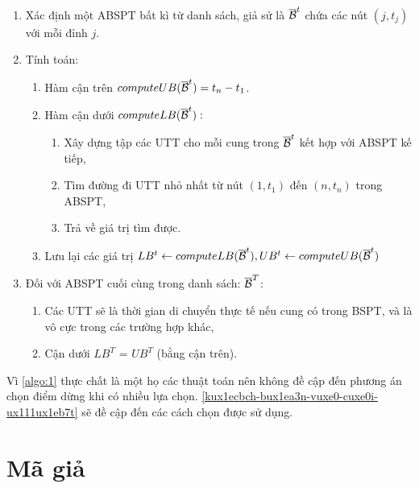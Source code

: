\documentclass[../main.tex]{subfiles}
\begin{document}
\begin{enumerate}
\def\labelenumi{\arabic{enumi}.}
\tightlist
\item
  Xác định một ABSPT bất kì từ danh sách, giả sử là
  \(\overline {\cal B} ^{t}\) chứa các nút \((j, t_j)\) với mỗi đỉnh
  \(j\).
\item
  Tính toán:

  \begin{enumerate}
  \def\labelenumii{\arabic{enumii}.}
  \tightlist
  \item
    Hàm cận trên \(computeUB(\overline {\cal B} ^{t}) = t_n -t_1\).
  \item
    Hàm cận dưới \(computeLB(\overline {\cal B} ^{t}):\)

    \begin{enumerate}
    \def\labelenumiii{\arabic{enumiii}.}
    \tightlist
    \item
      Xây dựng tập các UTT cho mỗi cung trong
      \(\overline {\cal B} ^{t}\) kết hợp với ABSPT kế tiếp,
    \item
      Tìm đường đi UTT nhỏ nhất từ nút \((1, t_1)\) đến \((n, t_n)\)
      trong ABSPT,
    \item
      Trả về giá trị tìm được.
    \end{enumerate}
  \item
    Lưu lại các giá trị
    \(LB^t \gets computeLB(\overline {\cal B} ^{t}), UB^t \gets computeUB(\overline {\cal B} ^{t})\)
  \end{enumerate}
\item
  Đối với ABSPT cuối cùng trong danh sách: \(\overline {\cal B} ^{T}\):

  \begin{enumerate}
  \def\labelenumii{\arabic{enumii}.}
  \tightlist
  \item
    Các UTT sẽ là thời gian di chuyển thực tế nếu cung có trong BSPT, và
    là vô cực trong các trường hợp khác,
  \item
    Cận dưới \(LB^T\) = \(UB^T\) (bằng cận trên).
  \end{enumerate}
\end{enumerate}

Vì \autoref{algo:1} thực chất là một họ các thuật toán nên không đề cập đến
phương án chọn điểm dừng khi có nhiều lựa chọn. \autoref{kux1ecbch-bux1ea3n-vuxe0-cuxe0i-ux111ux1eb7t} sẽ đề cập đến
các cách chọn được sử dụng.

\section{Mã giả}\label{muxe3-giux1ea3}
\end{document}

